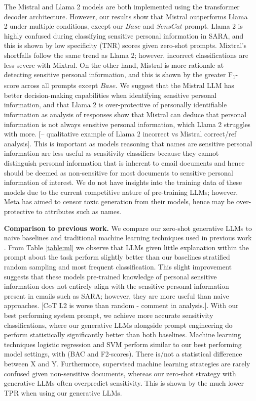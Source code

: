 The Mistral and Llama 2 models are both implemented using the transformer decoder architecture. However, our results show that Mistral outperforms Llama 2 under multiple conditions, except our $Base$ and $SensCat$ prompt. Llama 2 is highly confused during classifying sensitive personal information in SARA, and this is shown by low specificity (TNR) scores given zero-shot prompts. Mixtral's shortfalls follow the same trend as Llama 2; however, incorrect classifications are less severe with Mixtral. On the other hand, Mistral is more rationale at detecting sensitive personal information, and this is shown by the greater F\textsubscript{1}-score across all prompts except $Base$. We suggest that the Mistral LLM has better decision-making capabilities when identifying sensitive personal information, and that Llama 2 is over-protective of personally identifiable information as analysis of responses show that Mistral can deduce that personal information is not always sensitive personal information, which Llama 2 struggles with more. [– qualitative example of Llama 2 incorrect vs Mistral correct/ref analysis]. This is important as models reasoning that names are sensitive personal information are less useful as sensitivity classifiers because they cannot distinguish personal information that is inherent to email documents and hence should be deemed as non-sensitive for most documents to sensitive personal information of interest. We do not have insights into the training data of these models due to the current competitive nature of pre-training LLMs; however, Meta has aimed to censor toxic generation from their models, hence may be over-protective to attributes such as names.

\textbf{Comparison to previous work.} We compare our zero-shot generative LLMs to naive baselines and traditional machine learning techniques used in previous work \cite{mckechnie2024sara}. From Table \ref{table:ml} we observe that LLMs given little explanation within the prompt about the task perform slightly better than our baselines stratified random sampling and most frequent classification. This slight improvement suggests that these models pre-trained knowledge of personal sensitive information does not entirely align with the sensitive personal information present in emails such as SARA; however, they are more useful than naive approaches. [CoT L2 is worse than random - comment in analysis.]. With our best performing system prompt, we achieve more accurate sensitivity classifications, where our generative LLMs alongside prompt engineering do perform statistically significantly better than both baselines. Machine learning techniques logistic regression and SVM perform similar to our best performing model settings, with (BAC and F2-scores). There is/not a statistical difference between X and Y. Furthermore, supervised machine learning strategies are rarely confused given non-sensitive documents, whereas our zero-shot strategy with generative LLMs often overpredict sensitivity. This is shown by the much lower TPR when using our generative LLMs. 

